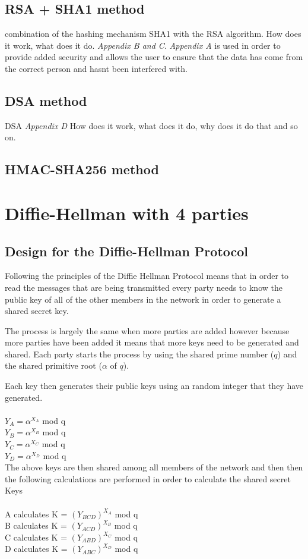 \documentclass[a4paper, twoside, 11pt]{article}
\begin{document}
\subsection{RSA + SHA1 method}
combination of the hashing mechanism SHA1 with the RSA algorithm. How does it work, what does it do. \textit {Appendix B and C}.
\textit { Appendix A } is used in order to provide added security and allows the user to ensure that the data has come from the correct person and hasnt been interfered with.
\subsection{DSA method}
DSA  \textit{Appendix D} How does it work, what does it do, why does it do that and so on.
\subsection{HMAC-SHA256 method}


\section{Diffie-Hellman with 4 parties}
\subsection{Design for the Diffie-Hellman Protocol}
Following the principles of the Diffie Hellman Protocol means that in order
to read the messages that are being transmitted every party needs to know the
public key of all of the other members in the network in order to generate a shared secret key.

The process is largely the same when more parties are added however because more parties have been added it means that more keys need to be generated and shared. Each party starts the process by using the shared prime number ($q$) and the shared primitive root ($\alpha$ of $q$).

Each key then generates their public keys using an random integer that they have generated. \\
\\
$Y_A = \alpha^{X_A}$ mod q \\
$Y_B = \alpha^{X_B}$ mod q \\
$Y_C = \alpha^{X_C}$ mod q \\
$Y_D = \alpha^{X_D}$ mod q \\

The above keys are then shared among all members of the network and then
then the following calculations are performed in order to calculate the shared secret Keys\\
\\
A calculates K = $(Y_{BCD})^{X_A}$ mod q \\
B calculates K = $(Y_{ACD})^{X_B}$ mod q \\
C calculates K = $(Y_{ABD})^{X_C}$ mod q \\
D calculates K = $(Y_{ABC})^{X_D}$ mod q \\
\end{document}
